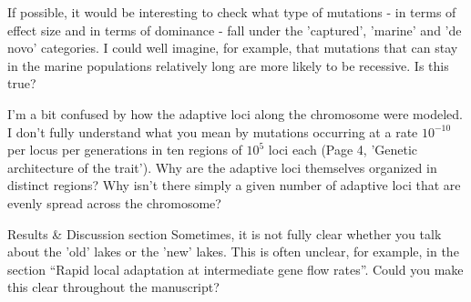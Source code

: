 
\begin{point}{}
If possible, it would be interesting to check what type of mutations - in terms of effect size and in terms of dominance - fall under the 'captured', 'marine' and 'de novo' categories. I could well imagine, for example, that mutations that can stay in the marine populations relatively long are more likely to be recessive. Is this true?
\end{point}


\begin{point}{}
I'm a bit confused by how the adaptive loci along the chromosome were modeled. I don't fully understand what you mean by mutations occurring at a rate $10^{-10}$ per locus per generations in ten regions of $10^5$ loci each (Page 4, 'Genetic architecture of the trait'). Why are the adaptive loci themselves organized in distinct regions? Why isn't there simply a given number of adaptive loci that are evenly spread across the chromosome?
\end{point}


\begin{point}{Results \& Discussion section}
    Sometimes, it is not fully clear whether you talk about the 'old' lakes or the 'new' lakes. This is often unclear, for example, in the section ``Rapid local adaptation at intermediate gene flow rates''. Could you make this clear throughout the manuscript?
\end{point}

